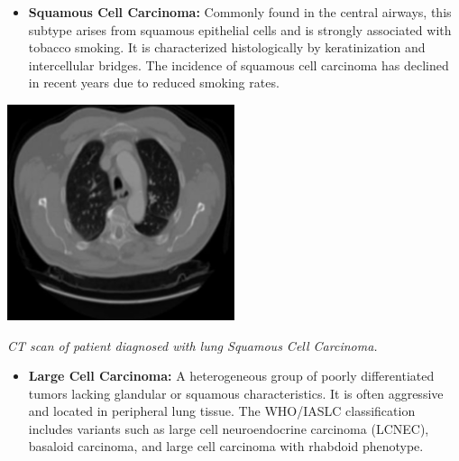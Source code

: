 \begin{itemize}
    \item \textbf{Squamous Cell Carcinoma:} Commonly found in the central airways, this subtype 
    arises from squamous epithelial cells and is strongly associated with tobacco smoking. It is 
    characterized histologically by keratinization and intercellular bridges. The incidence of 
    squamous cell carcinoma has declined in recent years due to reduced smoking rates. 
    \cite{nlm2025}
\end{itemize}

\vspace{1em}
\begin{center}
    \includegraphics[width=0.5\textwidth]{../assets/01-overview/lc-scc-ct.jpg}

    \small\textit{CT scan of patient diagnosed with lung Squamous Cell Carcinoma. 
    \cite{SHATNAWI2025100188}}
\end{center}
\vspace{1em}

\begin{itemize}
    \item \textbf{Large Cell Carcinoma:} A heterogeneous group of poorly differentiated tumors 
    lacking glandular or squamous characteristics. It is often aggressive and located in peripheral 
    lung tissue. The WHO/IASLC classification includes variants such as large cell neuroendocrine 
    carcinoma (LCNEC), basaloid carcinoma, and large cell carcinoma with rhabdoid phenotype. 
    \cite{nlm2025}
\end{itemize}

